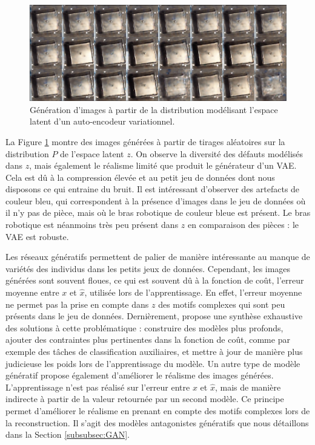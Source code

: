 \begin{figure}[hbtp]
	\centering
	\includegraphics[width=\textwidth,height=\textheight,keepaspectratio]{../Chap4/Figures/visualize_interpolations_latent.jpg}
	\caption{Génération d'images à partir de la distribution modélisant l'espace latent d'un auto-encodeur variationnel.}
	\label{fig:vae_sampling}
\end{figure}

La Figure \ref{fig:vae_sampling} montre des images générées à partir de tirages aléatoires sur la distribution $P$ de l'espace latent $z$.
On observe la diversité des défauts modélisés dans $z$, mais également le réalisme limité que produit le générateur d'un VAE.
Cela est dû à la compression élevée et au petit jeu de données dont nous disposons ce qui entraine du bruit.
Il est intéressant d'observer des artefacts de couleur bleu, qui correspondent à la présence d'images dans le jeu de données où il n'y pas de pièce, mais où le bras robotique de couleur bleue est présent.
Le bras robotique est néanmoins très peu présent dans $z$ en comparaison des pièces : le VAE est robuste.

Les réseaux génératifs permettent de palier de manière intéressante au manque de variétés des individus dans les petits jeux de données.
Cependant, les images générées sont souvent floues, ce qui est souvent dû à la fonction de coût, l'erreur moyenne entre $x$ et $\hat x$, utilisée lors de l'apprentissage.
En effet, l'erreur moyenne ne permet pas la prise en compte dans $z$ des motifs complexes qui sont peu présents dans le jeu de données.
Dernièrement, \citeauthor{kingma_introduction_2019} \cite{kingma_introduction_2019} propose une synthèse exhaustive des solutions à cette problématique : construire des modèles plus profonds, ajouter des contraintes plus pertinentes dans la fonction de coût, comme par exemple des tâches de classification auxiliaires, et mettre à jour de manière plus judicieuse les poids lors de l'apprentissage du modèle.
Un autre type de modèle génératif propose également d'améliorer le réalisme des images générées.
L'apprentissage n'est pas réalisé sur l'erreur entre $x$ et $\hat x$, mais de manière indirecte à partir de la valeur retournée par un second modèle.
Ce principe permet d'améliorer le réalisme en prenant en compte des motifs complexes lors de la reconstruction.
Il s'agit des modèles antagonistes génératifs que nous détaillons dans la Section \ref{subsubsec:GAN}.

